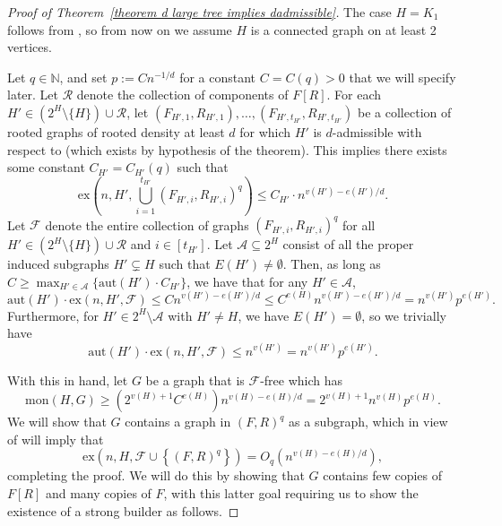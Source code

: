 \documentclass[12pt,letterpaper]{article}
\theoremstyle{definition}
\newcommand{\pow}{q} %
\newcommand{\mon}{\mathrm{mon}}
\begin{document}
	\begin{proof}[Proof of Theorem~\ref{theorem d large tree implies dadmissible}]
		The case $H=K_1$ follows from , so from now on we assume $H$ is a connected graph on at least 2 vertices.
		
		
		Let $\pow\in\mathbb{N}$, and set $p:= Cn^{-1/d}$ for a constant $C=C(\pow)>0$ that we will specify later. Let $\mathcal{R}$ denote the collection of components of $F[R]$. For each $H'\in (2^{H}\setminus \{H\})\cup \mathcal{R}$,  let $(F_{H',1},R_{H',1}),\dots,(F_{H',t_{H'}},R_{H',t_{H'}})$ be a collection of rooted graphs of rooted density at least $d$ for which $H'$ is $d$-admissible with respect to (which exists by hypothesis of the theorem).  This implies there exists some constant $C_{H'}=C_{H'}(\pow)$ such that
		\[
		\mathrm{ex}\left(n,H',\bigcup_{i=1}^{t_{H'}}(F_{H',i},R_{H',i})^{\pow}\right)\leq C_{H'}\cdot n^{v(H')-e(H')/d}.
		\]
		Let $\mathcal{F}$ denote the entire collection of graphs $(F_{H',i},R_{H',i})^{\pow}$ for all $H'\in (2^{H}\setminus \{H\})\cup \mathcal{R}$ and $i\in [t_{H'}]$. Let $\mathcal{A}\subseteq 2^{H}$ consist of all the proper induced subgraphs $H'\subsetneq H$ such that $E(H')\neq \emptyset$. Then, as long as $C\geq \max_{H'\in \mathcal{A}}\{\mathrm{aut}(H')\cdot C_{H'}\}$, we have that for any $H'\in\mathcal{A}$,
		\begin{equation}\label{equation nonempty subgraphs are bounded}
			\mathrm{aut}(H')\cdot \mathrm{ex}(n,H',\mathcal{F})\leq Cn^{v(H')-e(H')/d}\leq C^{e(H)}n^{v(H')-e(H')/d}=n^{v(H')}p^{e(H')}.
		\end{equation}
		Furthermore, for $H'\in 2^{H}\setminus\mathcal{A}$ with $H'\neq H$, we have $E(H')=\emptyset$, so we trivially have 
		\begin{equation}\label{equation empty subgraphs are bounded}
			\mathrm{aut}(H')\cdot \mathrm{ex}(n,H',\mathcal{F})\leq n^{v(H')}=n^{v(H')}p^{e(H')}.
		\end{equation}
		
		With this in hand, let $G$ be a graph that is $\mathcal{F}$-free which has
		\[
		\mon(H,G)\ge \left(2^{v(H)+1}C^{e(H)}\right)n^{v(H)-e(H)/d}=2^{v(H)+1}n^{v(H)}p^{e(H)}.
		\]
		We will show that $G$ contains a graph in $(F,R)^{\pow}$ as a subgraph, which in view of  will imply that
		\[
		\mathrm{ex}\left(n,H,\mathcal{F}\cup\left\{(F,R)^{\pow}\right\}\right)=O_{\pow}(n^{v(H)-e(H)/d}),
		\]
		completing the proof. We will do this by showing that $G$ contains few copies of $F[R]$ and many copies of $F$, with this latter goal requiring us to show the existence of a strong builder as follows.
		

\end{proof}
\end{document}
